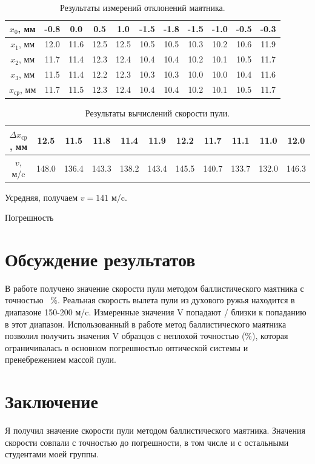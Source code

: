 \documentclass[
	a4paper, %
	12pt, %
]{article}
\begin{document}
	\begin{table}[h]
		\centering
		\begin{tabular}[H]{|c|c|c|c|c|c|c|c|c|c|c|}
			\hline
			$x_0$, мм & -0.8 & 0.0 & 0.5 & 1.0 & -1.5 & -1.8 & -1.5 & -1.0 & -0.5 & -0.3  \\
			\hline
			$x_1$, мм & 12.0 & 11.6 & 12.5 & 12.5 & 10.5 & 10.5 & 10.3 & 10.2 & 10.6 & 11.9  \\
			\hline
			$x_2$, мм & 11.7 & 11.4 & 12.3 & 12.4 & 10.4 & 10.4 & 10.2 & 10.1 & 10.5 & 11.7  \\
			\hline
			$x_3$, мм & 11.5 & 11.4 & 12.2 & 12.3 & 10.3 & 10.3 & 10.0 & 10.0 & 10.4 & 11.6  \\
			\hline
			$x_{\text{ср}}$, мм & 11.7 & 11.5 & 12.3 & 12.4 & 10.4 & 10.4 & 10.2 & 10.1 & 10.5 & 11.7  \\
			\hline
		\end{tabular}
		\caption{Результаты измерений отклонений маятника.}
		\label{table:2}
	\end{table}
	
	\begin{table}[h]
		\centering
		\begin{tabular}[H]{|c|c|c|c|c|c|c|c|c|c|c|}
			\hline
			$\Delta x_{\text{ср}}$, мм & 12.5 & 11.5 & 11.8 & 11.4 & 11.9 & 12.2 & 11.7 & 11.1 & 11.0 & 12.0  \\
			\hline
			$v$, м/c & 148.0 & 136.4 & 143.3 & 138.2 & 143.4  & 145.5 & 140.7 & 133.7 & 132.0 & 146.3  \\
			\hline
		\end{tabular}
		\caption{Результаты вычислений скорости пули.}
		\label{table:3}
	\end{table}
	
	Усредняя, получаем $v=141$ м/c.
	
	Погрешность
	\section{Обсуждение результатов}
	В работе получено значение скорости пули методом баллистического маятника с точностью ~{}\%. Реальная скорость вылета пули из духового ружья находится в диапазоне 150-200 м/c. Измеренные значения V попадают / близки к попаданию в этот диапазон.
	Использованный в работе метод баллистического маятника позволил получить значения V образцов с неплохой точностью ({}\%), которая ограничивалась в основном погрешностью оптической системы и пренебрежением массой пули.
	\section{Заключение}
	Я получил значение скорости пули методом баллистического маятника. Значения скорости совпали с точностью до погрешности, в том числе и с остальными студентами моей группы.
	
	
\end{document}
